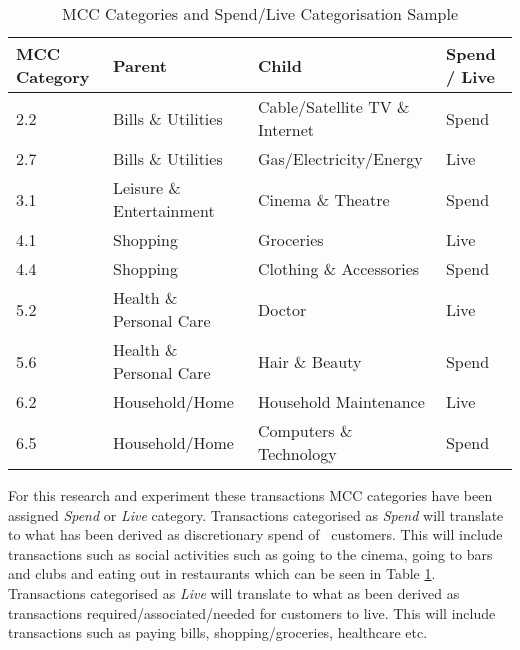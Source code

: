 \begin{table}[H]
	\centering
	\resizebox{\textwidth}{!}
	{
		\label{my-label}
		\begin{tabular}{|l|l|l|l|}
			\hline
			\textbf{MCC Category} & \textbf{Parent}          & \textbf{Child}                 & \textbf{Spend / Live} \\ \hline
			2.2                   & Bills \& Utilities       & Cable/Satellite TV \& Internet & Spend                 \\ \hline
			2.7                   & Bills \& Utilities       & Gas/Electricity/Energy         & Live                  \\ \hline
			3.1                   & Leisure \& Entertainment & Cinema \& Theatre              & Spend                 \\ \hline
			4.1                   & Shopping                 & Groceries                     & Live                  \\ \hline
			4.4                   & Shopping                 & Clothing \& Accessories        & Spend                 \\ \hline
			5.2                   & Health \& Personal Care  & Doctor                         & Live                  \\ \hline
			5.6                   & Health \& Personal Care  & Hair \& Beauty                 & Spend                 \\ \hline
			6.2                   & Household/Home           & Household Maintenance          & Live                  \\ \hline
			6.5                   & Household/Home           & Computers \& Technology        & Spend                 \\ \hline
		\end{tabular}
	}
	\caption{MCC Categories and Spend/Live Categorisation Sample}
	\label{table:mcc}
\end{table}

For this research and experiment these transactions MCC categories have been assigned \textit{Spend} or \textit{Live} category. Transactions categorised as \textit{Spend} will translate to what has been derived as discretionary spend of \subjectname\ customers. This will include transactions such as social activities such as going to the cinema, going to bars and clubs and eating out in restaurants which can be seen in Table \ref{table:mcc}. Transactions categorised as \textit{Live} will translate to what as been derived as transactions required/associated/needed for customers to live. This will include transactions such as paying bills, shopping/groceries, healthcare etc.

